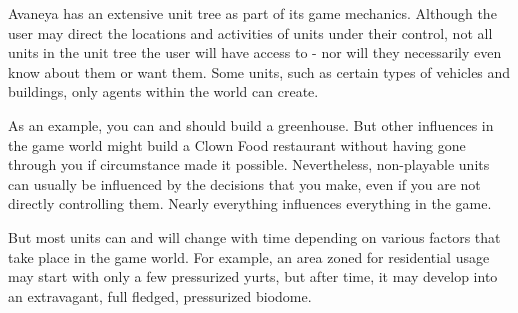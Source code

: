 

Avaneya has an extensive unit tree as part of its game mechanics. Although the user may direct the locations and activities of units under their control, not all units in the unit tree the user will have access to - nor will they necessarily even know about them or want them. Some units, such as certain types of vehicles and buildings, only agents within the world can create.

As an example, you can and should build a greenhouse. But other influences in the game world might build a Clown Food restaurant without having gone through you if circumstance made it possible. Nevertheless, non-playable units can usually be influenced by the decisions that you make, even if you are not directly controlling them. Nearly everything influences everything in the game.

But most units can and will change with time depending on various factors that take place in the game world. For example, an area zoned for residential usage may start with only a few pressurized yurts, but after time, it may develop into an extravagant, full fledged, pressurized biodome.

